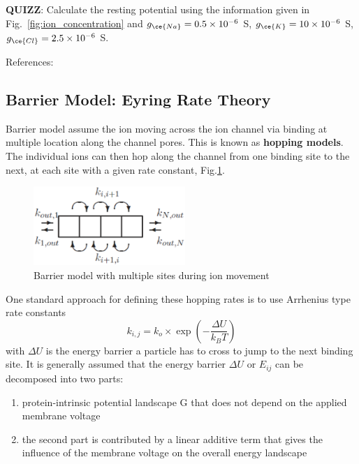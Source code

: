 
{\bf QUIZZ}: Calculate the resting potential using the information
given in Fig.~\ref{fig:ion_concentration} and $g_{\ce{Na}} = 0.5\times
10^{-6}$ S, $g_{\ce{K}} = 10\times 10^{-6}$ S,
$g_{\ce{Cl}} = 2.5\times 10^{-6}$
S.

References: ~\citep{moreton1968acf}



\subsection{Barrier Model: Eyring Rate Theory}
\label{sec:eyring-rate-theory}
\label{sec:energy-barrier}

Barrier model assume the ion moving across the ion channel via binding at
multiple location along the channel pores. This is known as {\bf hopping
models}. The individual ions can then hop along the channel from one binding
site to the next, at each site with a given rate constant,
Fig.\ref{fig:barrier-model-ion-channel}.

\begin{figure}[htb]
  \centerline{\includegraphics[height=3cm]{./images/barrier-model-ion-channel.eps}}
  \caption{Barrier model with multiple
  sites during ion movement}\label{fig:barrier-model-ion-channel}
\end{figure}

One standard approach for defining these hopping rates is to use
Arrhenius type rate constants
\begin{equation}
k_{i,j} = k_o \times \exp\left( - \frac{\Delta U}{k_BT} \right)
\end{equation}
with $\Delta U$ is the energy barrier a particle has to cross to jump to the next binding
site.  It is generally assumed that the energy barrier $\Delta U$ or $E_{ij}$
can be decomposed into two parts:
\begin{enumerate}
  \item protein-intrinsic potential landscape G that does not depend on the applied
membrane voltage

   \item the second part is contributed by a linear additive term that gives
the influence of the membrane voltage on the overall energy landscape
\end{enumerate}





